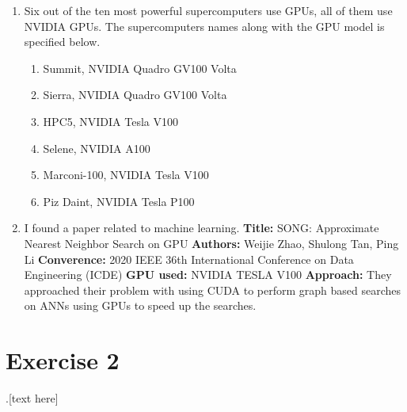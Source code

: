 \documentclass[a4paper, 12pt]{article}
\begin{document}
\begin{enumerate}
	\item Six out of the ten most powerful supercomputers use GPUs, all of them use NVIDIA GPUs. The supercomputers names along with the GPU model is specified below.
	\begin{enumerate}[label=\arabic*.]
		\item Summit, NVIDIA Quadro GV100 Volta
		\item Sierra, NVIDIA Quadro GV100 Volta
		\item HPC5, NVIDIA Tesla V100
		\item Selene, NVIDIA A100
		\item Marconi-100, NVIDIA Tesla V100
		\item Piz Daint, NVIDIA Tesla P100
	\end{enumerate}
	
	
	\item I found a paper related to machine learning.
	\newline \textbf{Title:} SONG: Approximate Nearest Neighbor Search on GPU
	\newline \textbf{Authors:} Weijie Zhao, Shulong Tan, Ping Li
	\newline \textbf{Converence:} 2020 IEEE 36th International Conference on Data Engineering (ICDE)
	\newline \textbf{GPU used:} NVIDIA TESLA V100
	\newline \textbf{Approach:} They approached their problem with using CUDA to perform graph based searches on ANNs using GPUs to speed up the searches.
\end{enumerate}

\section{Exercise 2}
.[text here]
\end{document}
